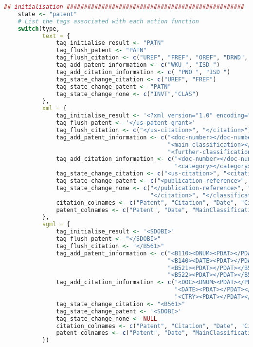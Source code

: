 \begin{lstlisting}[language=R]
    ## initialisation ###################################################
    state <- "patent"
    # List the tags associated with each action function
    switch(type,
           text = {
               tag_initialise_result <- "PATN"
               tag_flush_patent <- "PATN"
               tag_flush_citation <- c("UREF", "FREF", "OREF", "DRWD", "PATN")
               tag_add_patent_information <- c("WKU ", "ISD ")
               tag_add_citation_information <- c( "PNO ", "ISD ")
               tag_state_change_citation <- c("UREF", "FREF")
               tag_state_change_patent <- "PATN"
               tag_state_change_none <- c("INVT","CLAS")
           },
           xml = {
               tag_initialise_result <- '<?xml version="1.0" encoding="UTF-8"?>'
               tag_flush_patent <- '</us-patent-grant>'
               tag_flush_citation <- c("</us-citation>", "</citation>")
               tag_add_patent_information <- c("<doc-number></doc-number>", "<date></date>",
                                               "<main-classification></main-classification>", 
                                               "<further-classification></further-classification>")
               tag_add_citation_information <- c("<doc-number></doc-number>", "<date></date>", 
                                                 "<category></category>", "<country></country>")
               tag_state_change_citation <- c("<us-citation>", "<citation>")
               tag_state_change_patent <- c("<publication-reference>", "<classification-national>")
               tag_state_change_none <- c("</publication-reference>", "</us-ciation>", 
                                          "</citation>", "</classification-national>")
               citation_colnames <- c("Patent", "Citation", "Date", "CitedBy", "Country")
               patent_colnames <- c("Patent", "Date", "MainClassification", "FurtherClassification", "Order")
           },
           sgml = {
               tag_initialise_result <- '<SDOBI>'
               tag_flush_patent <- "</SDOBI>"
               tag_flush_citation <- "</B561>"
               tag_add_patent_information <- c("<B110><DNUM><PDAT></PDAT></DNUM></B110>", # patent number
                                               "<B140><DATE><PDAT></PDAT></DATE></B140>", # Date
                                               "<B521><PDAT></PDAT></B521>", # Main classification,
                                               "<B522><PDAT></PDAT></B522>") # Further classification
               tag_add_citation_information <- c("<DOC><DNUM><PDAT></PDAT></DNUM>", # Patent number
                                                 "<DATE><PDAT></PDAT></DATE>", # Patent Date
                                                 "<CTRY><PDAT></PDAT></CTRY>") # Country
               tag_state_change_citation <- "<B561>"
               tag_state_change_patent <- '<SDOBI>'
               tag_state_change_none <- NULL
               citation_colnames <- c("Patent", "Citation", "Date", "CitedBy", "Country")
               patent_colnames <- c("Patent", "Date", "MainClassification", "FurtherClassification", "Order")
           })
    

\end{lstlisting}
